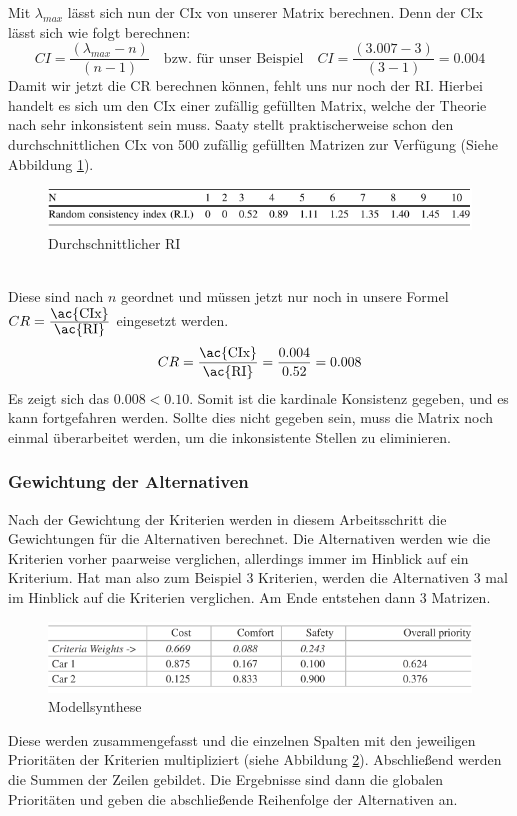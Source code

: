Mit $\lambda_{max}$ lässt sich nun der \ac{CIx} von unserer Matrix berechnen. 
Denn der \ac{CIx} lässt sich wie folgt berechnen:\autocite[Vgl.][S.14]{Mu.2018}
\[CI=\frac{(\lambda_{max}-n)}{(n-1)}\quad \mbox{bzw. für unser Beispiel}\quad CI=\frac{(3.007-3)}{(3-1)}=0.004\]
Damit wir jetzt die \ac{CR} berechnen können, fehlt uns nur noch der \ac{RI}. Hierbei handelt es sich um den \ac{CIx} einer zufällig gefüllten Matrix, welche der Theorie nach sehr inkonsistent sein muss. Saaty stellt praktischerweise schon den durchschnittlichen \ac{CIx} von 500 zufällig gefüllten Matrizen zur Verfügung (Siehe Abbildung \ref{img:ri}).\\
\begin{figure}[h!]
	\centering
	\includegraphics[scale = 0.9]{img/RI.png}
	\caption{Durchschnittlicher RI}
	\label{img:ri}
\end{figure}\\
Diese sind nach $n$ geordnet und müssen jetzt nur noch in unsere Formel $CR=\frac{\mbox{\ac{CIx}}}{\mbox{\ac{RI}}}$ eingesetzt werden.
\[CR=\frac{\mbox{\ac{CIx}}}{\mbox{\ac{RI}}}=\frac{0.004}{0.52}=0.008\]
Es zeigt sich das $0.008<0.10$. Somit ist die kardinale Konsistenz gegeben, und es kann fortgefahren werden. Sollte dies nicht gegeben sein, muss die Matrix noch einmal überarbeitet werden, um die inkonsistente Stellen zu eliminieren.\autocite[Vgl.][S.108]{Fink.2006}
\subsubsection{Gewichtung der Alternativen}
Nach der Gewichtung der Kriterien werden in diesem Arbeitsschritt die Gewichtungen für die Alternativen berechnet. Die Alternativen werden wie die Kriterien vorher paarweise verglichen, allerdings immer im Hinblick auf ein Kriterium. Hat man also zum Beispiel 3 Kriterien, werden die Alternativen 3 mal im Hinblick auf die Kriterien verglichen. Am Ende entstehen dann 3 Matrizen. 
\begin{figure}[h!]
	\centering
	\includegraphics[scale = 0.9]{img/All.png}
	\caption{Modellsynthese}
	\label{img:all}
\end{figure}
Diese werden zusammengefasst und die einzelnen Spalten mit den jeweiligen Prioritäten der Kriterien multipliziert\autocite[Vgl.][S.19]{Mu.2018} (siehe Abbildung \ref{img:all}). Abschließend werden die Summen der Zeilen gebildet. Die Ergebnisse sind dann die globalen Prioritäten und geben die abschließende Reihenfolge der Alternativen an. 
